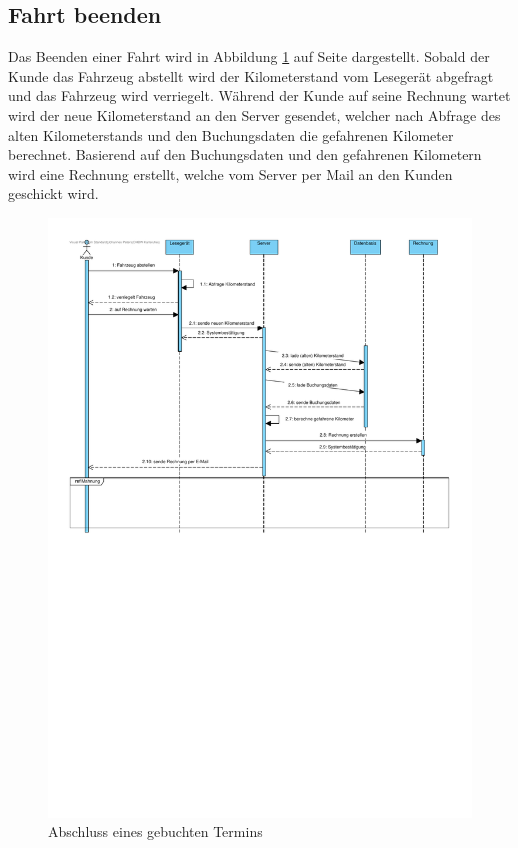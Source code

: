 \newpage

\subsection{Fahrt beenden}

Das Beenden einer Fahrt wird in Abbildung \ref{img:buchung03} auf Seite \pageref{img:buchung03} dargestellt. Sobald der Kunde das Fahrzeug abstellt wird der Kilometerstand vom Lesegerät abgefragt und das Fahrzeug wird verriegelt. Während der Kunde auf seine Rechnung wartet wird der neue Kilometerstand an den Server gesendet, welcher nach Abfrage des alten Kilometerstands und den Buchungsdaten die gefahrenen Kilometer berechnet. Basierend auf den Buchungsdaten und den gefahrenen Kilometern wird eine Rechnung erstellt, welche vom Server per Mail an den Kunden geschickt wird.


\begin{figure}[!ht]
    \centering
    \includegraphics[width=\textwidth, trim = 0cm 14cm 0cm 0cm]{Bilder/Diagramme/SD_Buchungsvorgang_03.pdf}
    \caption{Abschluss eines gebuchten Termins}
    \label{img:buchung03}
\end{figure}

